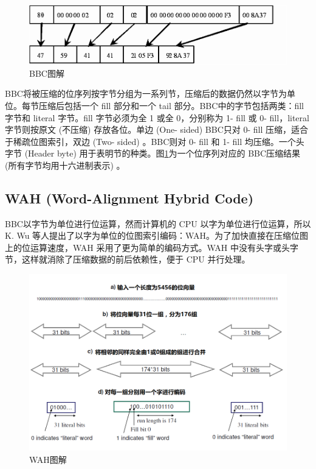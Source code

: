 \documentclass[11pt, a4paper]{article}
\begin{document}
  \begin{figure}[H]
    \begin{center}
      \includegraphics[width=5in]{bbc.png}
      \caption{BBC图解}\label{fig:bbc}
    \end{center}
  \end{figure}

  BBC将被压缩的位序列按字节分组为一系列节，压缩后的数据仍然以字节为单位。每节压缩后包括一个 fill 部分和一个 tail 部分。BBC中的字节包括两类：fill 字节和 literal 字节。fill 字节必须为全 1 或全 0，分别称为 1- fill 或 0- fill，literal 字节则按原文 (不压缩) 存放各位。单边 (One- sided) BBC只对 0- fill 压缩，适合于稀疏位图索引，双边 (Two- sided) 。BBC则对 0- fill 和 1- fill 均压缩。一个头字节 (Header byte) 用于表明节的种类。图\ref{fig:bbc}为一个位序列对应的 BBC压缩结果 (所有字节均用十六进制表示) 。

  \subsection{WAH (Word-Alignment Hybrid Code)}

  BBC以字节为单位进行位运算，然而计算机的 CPU 以字为单位进行位运算，所以 K. Wu 等人提出了以字为单位的位图索引编码：WAH。为了加快直接在压缩位图上的位运算速度，WAH 采用了更为简单的编码方式。WAH 中没有头字或头字节，这样就消除了压缩数据的前后依赖性，便于 CPU 并行处理。

  \begin{figure}[H]
    \begin{center}
      \includegraphics[width=5in]{wah.png}
      \caption{WAH图解}\label{fig:wah}
    \end{center}
  \end{figure}
\end{document}
